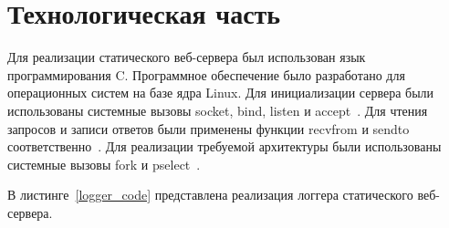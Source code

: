 \chapter{Технологическая часть}

Для реализации статического веб-сервера был использован язык программирования C.
Программное обеспечение было разработано для операционных систем на базе ядра Linux.
Для инициализации сервера были использованы системные вызовы socket, bind, listen и accept~\cite{socket_sys, bind, listen, accept}.
Для чтения запросов и записи ответов были применены функции recvfrom и sendto соответственно~\cite{recvfrom, sendto}.
Для реализации требуемой архитектуры были использованы системные вызовы fork и pselect~\cite{fork, pselect}.

В листинге~\ref{logger_code} представлена реализация логгера статического веб-сервера.
